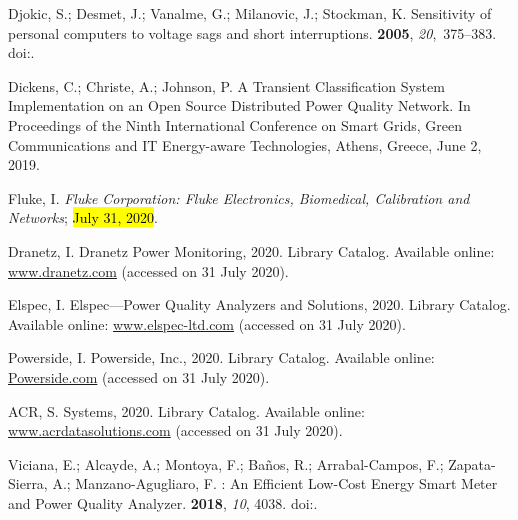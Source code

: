 \documentclass[energies,article,accept,moreauthors,pdftex]{Definitions/mdpi}
\begin{document}
\begin{thebibliography}{999}
Djokic, S.; Desmet, J.; Vanalme, G.; Milanovic, J.; Stockman, K.
\newblock Sensitivity of personal computers to voltage sags and short
interruptions.
 {\bf 2005}, {\em
20},~375--383.
\newblock
doi:{\href{https://doi.org/10.1109/TPWRD.2004.837828}{}}.

Dickens, C.; Christe, A.; Johnson, P.
\newblock A {Transient} {Classification} {System} {Implementation} on an {Open}
{Source} {Distributed} {Power} {Quality} {Network}.
\newblock  In Proceedings of the {Ninth} {International} {Conference} on {Smart}
{Grids}, {Green} {Communications} and {IT} {Energy}-aware {Technologies}, Athens, Greece,
June 2, 2019.

Fluke, I.
\newblock \emph{Fluke {Corporation}: {Fluke} {Electronics}, {Biomedical},
{Calibration} and {Networks}}; \hl{July 31, 2020}.

Dranetz, I.
\newblock Dranetz {Power} {Monitoring}, 2020.
\newblock Library Catalog. Available online:  \url{ www.dranetz.com} (accessed on 31 July 2020).

Elspec, I.
\newblock Elspec---{Power} Quality Analyzers and Solutions, 2020.
\newblock Library Catalog. Available online:  \url{www.elspec-ltd.com} (accessed on 31 July 2020).

Powerside, I.
\newblock Powerside, {Inc}., 2020.
\newblock Library Catalog. Available online:  \url{Powerside.com}  (accessed on 31 July 2020).

ACR, S.
 {Systems}, 2020.
\newblock Library Catalog. Available online:  \url{www.acrdatasolutions.com}  (accessed on 31 July 2020).

Viciana, E.; Alcayde, A.; Montoya, F.; Baños, R.; Arrabal-Campos, F.;
Zapata-Sierra, A.; Manzano-Agugliaro, F.
: {An} {Efficient} {Low}-{Cost} {Energy} {Smart} {Meter}
and {Power} {Quality} {Analyzer}.
 {\bf 2018}, {\em 10}, 4038.
\newblock
doi:{\href{https://doi.org/10.3390/su10114038}{}}.


\end{thebibliography}
\end{document}
